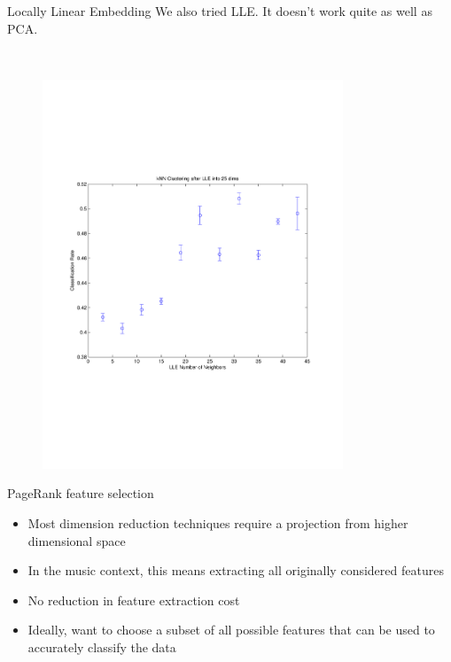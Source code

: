 \documentclass[xcolor=dvipsnames,t]{beamer} %
\begin{document}
\begin{frame}{Locally Linear Embedding}
   We also tried LLE.  It doesn't work quite as well as PCA.

   ~\\[-7em]
   \begin{figure}
      \centering
      \includegraphics[width=0.8\textwidth]{figures/optimkNNLLE.pdf}
   \end{figure}
\end{frame}

\begin{frame}{PageRank feature selection}
\begin{itemize}
\item Most dimension reduction techniques require a projection from higher dimensional space
\item In the music context, this means extracting all originally considered features
\item No reduction in feature extraction cost
\item Ideally, want to choose a subset of all possible features that can be used to accurately classify the data
\end{itemize}
\end{frame}
\end{document}

